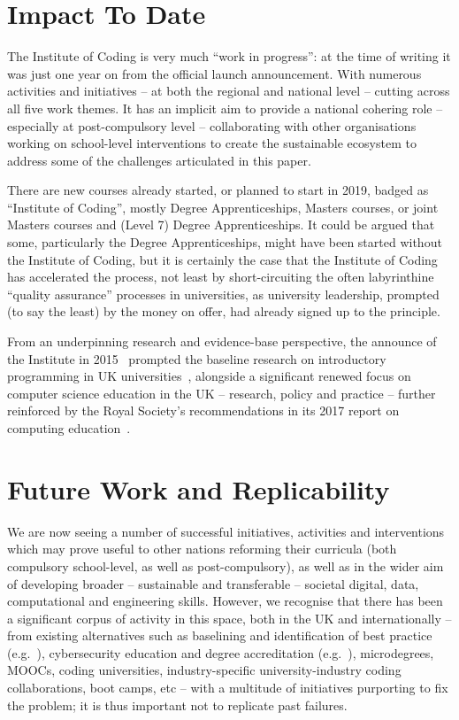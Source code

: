 \documentclass[conference]{IEEEtran}
\begin{document}
\section{Impact To Date}

The Institute of Coding is very much ``work in progress'': at the time
of writing it was just one year on from the official launch
announcement.  With numerous activities and initiatives -- at both the
regional and national level -- cutting across all five work themes. It
has an implicit aim to provide a national cohering role -- especially
at post-compulsory level -- collaborating with other organisations
working on school-level interventions to create the sustainable
ecosystem to address some of the challenges articulated in this paper.

There are new courses already started, or planned to start in 2019,
badged as ``Institute of Coding'', mostly Degree Apprenticeships,
Masters courses, or joint Masters courses and (Level 7) Degree
Apprenticeships.  It could be argued that some, particularly the
Degree Apprenticeships, might have been started without the Institute
of Coding, but it is certainly the case that the Institute of Coding
has accelerated the process, not least by short-circuiting the often
labyrinthine ``quality assurance'' processes in universities, as
university leadership, prompted (to say the least) by the money on
offer, had already signed up to the principle.

From an underpinning research and evidence-base perspective, the
announce of the Institute in 2015~\cite{HMG2015a} prompted the
baseline research on introductory programming in UK
universities~\cite{murphy-et-al:programming2017,simon-et-al:sigcse2018},
alongside a significant renewed focus on computer science education in
the UK -- research, policy and practice -- further reinforced by the
Royal Society's recommendations in its 2017 report on computing
education~\cite{rs:2017}.


\section{Future Work and Replicability}\label{concl}

We are now seeing a number of successful initiatives, activities and
interventions which may prove useful to other nations reforming their
curricula (both compulsory school-level, as well as post-compulsory),
as well as in the wider aim of developing broader -- sustainable and
transferable -- societal digital, data, computational and engineering
skills. However, we recognise that there has been a significant corpus
of activity in this space, both in the UK and internationally -- from
existing alternatives such as baselining and identification of best
practice (e.g.~\cite{murphy-et-al:programming2017}), cybersecurity
education and degree accreditation (e.g.~\cite{crick-et-al:fie2019}),
microdegrees, MOOCs, coding universities, industry-specific
university-industry coding collaborations, boot camps, etc -- with a
multitude of initiatives purporting to fix the problem; it is thus
important not to replicate past failures.
\end{document}
